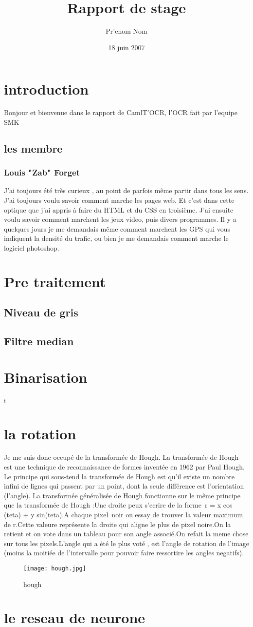 \documentclass[a4paper, titlepage]{article}
\title{Rapport de stage}
\author{Pr'enom Nom}
\date{18 juin 2007}
\begin{document}
\tableofcontent
\section{introduction}
Bonjour et bienvenue dans le rapport de CamlT'OCR, l'OCR fait par l'equipe SMK
\subsection{les membre}
\subsubsection{Louis "Zab" Forget}
J'ai toujours été très curieux , au point de parfois même partir dans tous les sens. J'ai
toujours voulu savoir comment marche les pages web. Et c'est dans cette optique que
j'ai appris à faire du HTML et du CSS en troisième. J'ai ensuite voulu savoir comment
marchent les jeux video, puis divers programmes. Il y a quelques jours je me demandais
même comment marchent les GPS qui vous indiquent la densité du trafic, ou bien
je me demandais comment marche le logiciel photoshop.
\section{Pre traitement}
\subsection{Niveau de gris}
\subsection{Filtre median}
\section{Binarisation}i
\section{la rotation}
Je me suis donc occupé de la transformée de Hough. La transformée de Hough est une technique de reconnaissance de formes inventée en 1962 par Paul Hough. Le principe qui sous-tend la transformée de Hough est qu’il existe un nombre infini de lignes qui passent par un point, dont la seule différence est l’orientation (l’angle). La transformée généralisée de Hough fonctionne sur le même principe que la transformée de Hough :Une droite peux s'ecrire de la forme r = x cos (teta) + y sin(teta).A chaque pixel noir on essay de trouver la valeur maximum de r.Cette valeure représente la droite qui aligne le plus de pixel noire.On la retient et on vote dans un tableau pour son angle associé.On refait la meme chose sur tous les pixels.L'angle qui a été le plus voté , est l'angle de rotation de l'image (moins la moitiée de l'intervalle pour pouvoir faire ressortire les angles negatifs).
\begin{figure}[hp]

	    \centering

	    \texttt{[image: hough.jpg]}

	    \caption{hough}

\end{figure}

\section{le reseau de neurone}
\end{document}
